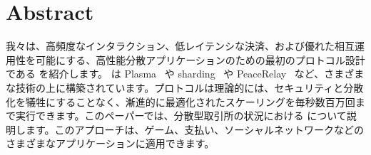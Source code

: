 \section*{Abstract}

我々は、高頻度なインタラクション、低レイテンシな決済、および優れた相互運用性を可能にする、高性能分散アプリケーションのための最初のプロトコル設計である \codename を紹介します。 \codename は Plasma~\cite{plasma} や sharding~ \cite{elastico} や PeaceRelay~\cite{peacerelay} など、さまざまな技術の上に構築されています。プロトコルは理論的には、セキュリティと分散化を犠牲にすることなく、漸進的に最適化されたスケーリングを毎秒数百万回まで実行できます。このペーパーでは、分散型取引所の状況における \codename について説明します。このアプローチは、ゲーム、支払い、ソーシャルネットワークなどのさまざまなアプリケーションに適用できます。

